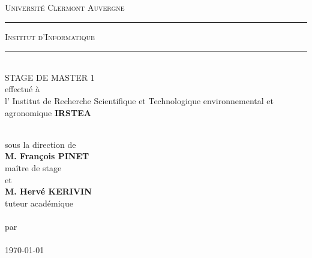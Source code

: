 \newcommand{\HRule}{\rule[2mm]{10mm}{0.5mm}}
\begin{center}
\textsc{\large Université Clermont Auvergne}\\[0.5mm]
\HRule \textsc{ Institut d'Informatique} \HRule \\[1cm]

\makeatletter
{STAGE DE MASTER 1}\\[0.4cm]

effectué à 
\\[0.2mm]
l' Institut de Recherche Scientifique et Technologique environnemental et agronomique {\bf IRSTEA}

\\[0.5cm]
sous la direction de\\[0.5cm]
{\bf M. François PINET}\\
maître de stage
\\[0.5cm]
et
\\[0.5cm]
{\bf M. Hervé KERIVIN}\\
tuteur académique
\\[2cm]

{\bf \uppercase \@title}\\[1cm]

par\\[1cm]

\@author \\[0.5cm]


\today
\end{center}
